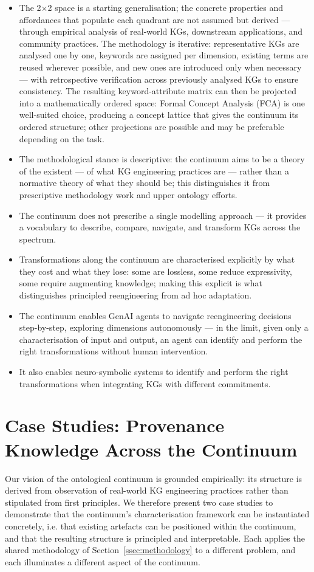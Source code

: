 \documentclass[runningheads]{llncs}
\newcommand{\add}[1]{\textcolor{addedcolor}{#1}}
\begin{document}
\begin{itemize}
    \item The 2$\times$2 space is a starting generalisation; the concrete properties and affordances that populate each quadrant are not assumed but derived --- through empirical analysis of real-world KGs, downstream applications, and community practices. The methodology is iterative: representative KGs are analysed one by one, keywords are assigned per dimension, existing terms are reused wherever possible, and new ones are introduced only when necessary --- with retrospective verification across previously analysed KGs to ensure consistency. The resulting keyword-attribute matrix can then be projected into a mathematically ordered space: Formal Concept Analysis (FCA) is one well-suited choice, producing a concept lattice that gives the continuum its ordered structure; other projections are possible and may be preferable depending on the task. %
	\item The methodological stance is descriptive: the continuum aims to be a theory of the existent --- of what KG engineering practices are --- rather than a normative theory of what they should be; this distinguishes it from prescriptive methodology work and upper ontology efforts. %
    \item The continuum does not prescribe a single modelling approach --- it provides a vocabulary to describe, compare, navigate, and transform KGs across the spectrum.
    \item Transformations along the continuum are characterised explicitly by what they cost and what they lose: some are lossless, some reduce expressivity, some require augmenting knowledge; making this explicit is what distinguishes principled reengineering from ad hoc adaptation. %
    \item The continuum enables GenAI agents to navigate reengineering decisions step-by-step, exploring dimensions autonomously --- in the limit, given only a characterisation of input and output, an agent can identify and perform the right transformations without human intervention. %
    \item It also enables neuro-symbolic systems to identify and perform the right transformations when integrating KGs with different commitments.
\end{itemize}

\section{Case Studies: Provenance Knowledge Across the Continuum}
\add{Our vision of the ontological continuum is grounded empirically: its structure is derived from observation of real-world KG engineering practices rather than stipulated from first principles. We therefore present two case studies to demonstrate that the continuum's characterisation framework can be instantiated concretely, i.e. that existing artefacts can be positioned within the continuum, and that the resulting structure is principled and interpretable. Each applies the shared methodology of
Section~\ref{ssec:methodology} to a different problem, and each
illuminates a different aspect of the continuum.}
\end{document}
